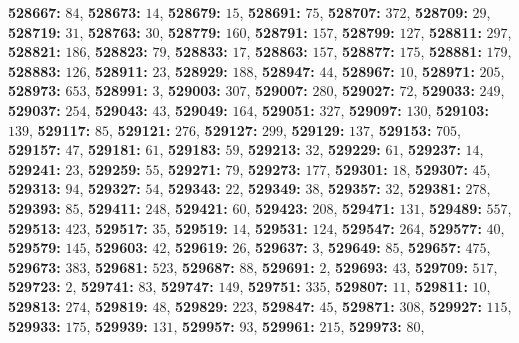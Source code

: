 \textsf{\bfseries 528667:} $84$, \textsf{\bfseries 528673:} $14$, \textsf{\bfseries 528679:} $15$, \textsf{\bfseries 528691:} $75$, \textsf{\bfseries 528707:} $372$, \textsf{\bfseries 528709:} $29$, \textsf{\bfseries 528719:} $31$, \textsf{\bfseries 528763:} $30$, \textsf{\bfseries 528779:} $160$, \textsf{\bfseries 528791:} $157$, \textsf{\bfseries 528799:} $127$, \textsf{\bfseries 528811:} $297$, \textsf{\bfseries 528821:} $186$, \textsf{\bfseries 528823:} $79$, \textsf{\bfseries 528833:} $17$, \textsf{\bfseries 528863:} $157$, \textsf{\bfseries 528877:} $175$, \textsf{\bfseries 528881:} $179$, \textsf{\bfseries 528883:} $126$, \textsf{\bfseries 528911:} $23$, \textsf{\bfseries 528929:} $188$, \textsf{\bfseries 528947:} $44$, \textsf{\bfseries 528967:} $10$, \textsf{\bfseries 528971:} $205$, \textsf{\bfseries 528973:} $653$, \textsf{\bfseries 528991:} $3$, \textsf{\bfseries 529003:} $307$, \textsf{\bfseries 529007:} $280$, \textsf{\bfseries 529027:} $72$, \textsf{\bfseries 529033:} $249$, \textsf{\bfseries 529037:} $254$, \textsf{\bfseries 529043:} $43$, \textsf{\bfseries 529049:} $164$, \textsf{\bfseries 529051:} $327$, \textsf{\bfseries 529097:} $130$, \textsf{\bfseries 529103:} $139$, \textsf{\bfseries 529117:} $85$, \textsf{\bfseries 529121:} $276$, \textsf{\bfseries 529127:} $299$, \textsf{\bfseries 529129:} $137$, \textsf{\bfseries 529153:} $705$, \textsf{\bfseries 529157:} $47$, \textsf{\bfseries 529181:} $61$, \textsf{\bfseries 529183:} $59$, \textsf{\bfseries 529213:} $32$, \textsf{\bfseries 529229:} $61$, \textsf{\bfseries 529237:} $14$, \textsf{\bfseries 529241:} $23$, \textsf{\bfseries 529259:} $55$, \textsf{\bfseries 529271:} $79$, \textsf{\bfseries 529273:} $177$, \textsf{\bfseries 529301:} $18$, \textsf{\bfseries 529307:} $45$, \textsf{\bfseries 529313:} $94$, \textsf{\bfseries 529327:} $54$, \textsf{\bfseries 529343:} $22$, \textsf{\bfseries 529349:} $38$, \textsf{\bfseries 529357:} $32$, \textsf{\bfseries 529381:} $278$, \textsf{\bfseries 529393:} $85$, \textsf{\bfseries 529411:} $248$, \textsf{\bfseries 529421:} $60$, \textsf{\bfseries 529423:} $208$, \textsf{\bfseries 529471:} $131$, \textsf{\bfseries 529489:} $557$, \textsf{\bfseries 529513:} $423$, \textsf{\bfseries 529517:} $35$, \textsf{\bfseries 529519:} $14$, \textsf{\bfseries 529531:} $124$, \textsf{\bfseries 529547:} $264$, \textsf{\bfseries 529577:} $40$, \textsf{\bfseries 529579:} $145$, \textsf{\bfseries 529603:} $42$, \textsf{\bfseries 529619:} $26$, \textsf{\bfseries 529637:} $3$, \textsf{\bfseries 529649:} $85$, \textsf{\bfseries 529657:} $475$, \textsf{\bfseries 529673:} $383$, \textsf{\bfseries 529681:} $523$, \textsf{\bfseries 529687:} $88$, \textsf{\bfseries 529691:} $2$, \textsf{\bfseries 529693:} $43$, \textsf{\bfseries 529709:} $517$, \textsf{\bfseries 529723:} $2$, \textsf{\bfseries 529741:} $83$, \textsf{\bfseries 529747:} $149$, \textsf{\bfseries 529751:} $335$, \textsf{\bfseries 529807:} $11$, \textsf{\bfseries 529811:} $10$, \textsf{\bfseries 529813:} $274$, \textsf{\bfseries 529819:} $48$, \textsf{\bfseries 529829:} $223$, \textsf{\bfseries 529847:} $45$, \textsf{\bfseries 529871:} $308$, \textsf{\bfseries 529927:} $115$, \textsf{\bfseries 529933:} $175$, \textsf{\bfseries 529939:} $131$, \textsf{\bfseries 529957:} $93$, \textsf{\bfseries 529961:} $215$, \textsf{\bfseries 529973:} $80$, 
